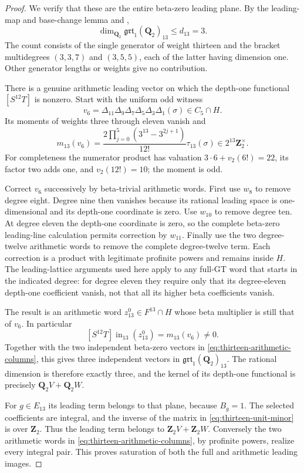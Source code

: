 \begin{proof}
We verify that these are the entire beta-zero leading plane.
By the leading-map and base-change lemma and
\cite[Theorem~1.1, p.~2]{Willwacher},
\[
 \dim_{\mathbf Q_2}\mathfrak{grt}_1(\mathbf Q_2)_{13}
       \le d_{13}=3.
\]
The count consists of the single generator of weight thirteen
and the bracket multidegrees $(3,3,7)$ and $(3,5,5)$, each of
the latter having dimension one. Other generator lengths or
weights give no contribution.

There is a genuine arithmetic leading vector on which the
depth-one functional $[S^{12}T]$ is nonzero. Start with the
uniform odd witness
\[
 v_6=\Delta_{11}\Delta_9\Delta_7\Delta_5\Delta_3
                  \Delta_1(\sigma)\in C_5\cap H.
\]
Its moments of weights three through eleven vanish and
\[
 m_{13}(v_6)=
 \frac{2\prod_{j=0}^{5}(3^{13}-3^{2j+1})}{12!}
                        \tau_{13}(\sigma)
            \in 2^{13}\mathbf Z_2^\times.
\]
For completeness the numerator product has valuation
$3\cdot6+v_2(6!)=22$, its factor two adds one, and
$v_2(12!)=10$; the moment is odd.

Correct $v_6$ successively by beta-trivial arithmetic words.
First use $w_8$ to remove degree eight. Degree nine then vanishes
because its rational leading space is one-dimensional and its
depth-one coordinate is zero. Use $w_{10}$ to remove degree ten.
At degree eleven the depth-one coordinate is zero, so the
complete beta-zero leading-line calculation permits correction
by $w_{11}$. Finally use the two degree-twelve arithmetic words
to remove the complete degree-twelve term. Each correction is
a product with legitimate profinite powers and remains inside
$H$. The leading-lattice arguments used here apply to any full-GT
word that starts in the indicated degree: for degree eleven they
require only that its degree-eleven depth-one coefficient vanish,
not that all its higher beta coefficients vanish.

The result is an arithmetic word $z_{13}^0\in F^{13}\cap H$
whose beta multiplier is still that of $v_6$. In particular
\[
 [S^{12}T]\operatorname{in}_{13}(z_{13}^0)
       =m_{13}(v_6)\ne0.
\]
Together with the two independent beta-zero vectors
in \eqref{eq:thirteen-arithmetic-columns}, this gives three
independent vectors in $\mathfrak{grt}_1(\mathbf Q_2)_{13}$.
The rational dimension is therefore exactly three, and the
kernel of its depth-one functional is precisely
$\mathbf Q_2V+\mathbf Q_2W$.

For $g\in E_{13}$ its leading term belongs to that plane,
because $B_g=1$. The selected coefficients are integral, and
the inverse of the matrix in \eqref{eq:thirteen-unit-minor}
is over $\mathbf Z_2$. Thus the leading term belongs to
$\mathbf Z_2V+\mathbf Z_2W$. Conversely the two arithmetic
words in \eqref{eq:thirteen-arithmetic-columns}, by
profinite powers, realize every integral pair. This proves
saturation of both the full and arithmetic leading images.


\end{proof}
